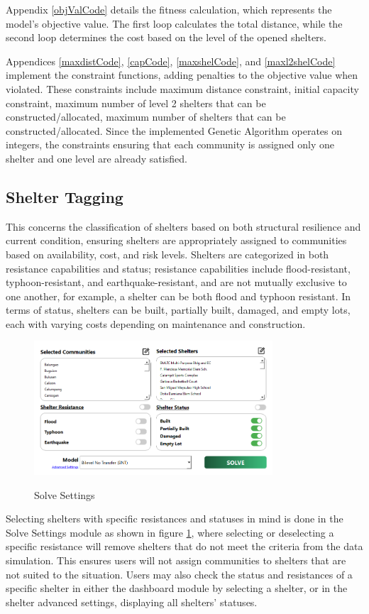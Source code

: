 	Appendix \ref{objValCode} details the fitness calculation, which represents the model's objective value. The first loop calculates the total distance, while the second loop determines the cost based on the level of the opened shelters.
	
	Appendices \ref{maxdistCode}, \ref{capCode}, \ref{maxshelCode}, and \ref{maxl2shelCode} implement the constraint functions, adding penalties to the objective value when violated. These constraints include maximum distance constraint, initial capacity constraint, maximum number of level 2 shelters that can be constructed/allocated, maximum number of shelters that can be constructed/allocated. Since the implemented Genetic Algorithm operates on integers, the constraints ensuring that each community is assigned only one shelter and one level are already satisfied.
	
\subsection{Shelter Tagging}
	This concerns the classification of shelters based on both structural resilience and current condition, ensuring shelters are appropriately assigned to communities based on availability, cost, and risk levels. Shelters are categorized in both resistance capabilities and status; resistance capabilities include flood-resistant, typhoon-resistant, and earthquake-resistant, and are not mutually exclusive to one another, for example, a shelter can be both flood and typhoon resistant. In terms of status, shelters can be built, partially built, damaged, and empty lots, each with varying costs depending on maintenance and construction.
	
	\begin{figure}[h!]
		\caption{Solve Settings}
		\centering
		\includegraphics[width=3.5in]{Chapter 4/solvesettings}
		\label{solveSet}
	\end{figure}
	Selecting shelters with specific resistances and statuses in mind is done in the Solve Settings module as shown in figure \ref{solveSet}, where selecting or deselecting a specific resistance will remove shelters that do not meet the criteria from the data simulation. This ensures users will not assign communities to shelters that are not suited to the situation. Users may also check the status and resistances of a specific shelter in either the dashboard module by selecting a shelter, or in the shelter advanced settings, displaying all shelters’ statuses.
	

